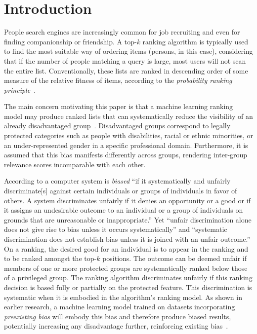 \section{Introduction}\label{sec:introduction}

People search engines are increasingly common for job recruiting and even for finding companionship or friendship.
%
A top-$k$ ranking algorithm is typically used to find the most suitable way of ordering items (persons, in this case), considering that if the number of people matching a query is large, most users will not scan the entire list.
%
Conventionally, these lists are ranked in descending order of some measure of the relative fitness of items, according to the \emph{probability ranking principle}~\cite{robertson1977probability}.
%

The main concern motivating this paper is that a machine learning ranking model may produce ranked lists that can systematically reduce the visibility of an already disadvantaged group~\cite{peder2008,Dwork2012}.
%
Disadvantaged groups correspond to legally protected categories such as people with disabilities, racial or ethnic minorities, or an under-represented gender in a specific professional domain.
%
Furthermore, it is assumed that this bias manifests differently across groups, rendering inter-group relevance scores incomparable with each other.
%

According to \citet{friedman1996bias} a computer system is \emph{biased} ``if it systematically and unfairly discriminate[s] against certain individuals or groups of individuals in favor of others.
%
A system discriminates unfairly if it denies an opportunity or a good or if it assigns an undesirable outcome to an individual or a group of individuals on grounds that are unreasonable or inappropriate.''
%
Yet ``unfair discrimination alone does not give rise to bias unless it occurs systematically'' and ``systematic discrimination does not establish bias unless it is joined with an unfair outcome.''
%
On a ranking, the desired good for an individual is to appear in the ranking and to be ranked amongst the top-$k$ positions.
%
The outcome can be deemed unfair if members of one or more protected groups are systematically ranked below those of a privileged group.
%
The ranking algorithm discriminates unfairly if this ranking decision is based fully or partially on the protected feature.
%
This discrimination is systematic when it is embodied in the algorithm's ranking model.
%
As shown in earlier research, a machine learning model trained on datasets incorporating \textit{preexisting bias} will embody this bias and therefore produce biased results, potentially increasing any disadvantage further, reinforcing existing bias~\cite{oneil2016weapons}.
%

